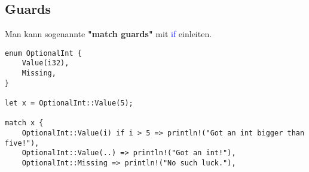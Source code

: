 \subsection{Guards}
Man kann sogenannte \textbf{"match guards"} mit \textcolor{blue}{if} einleiten.

\begin{lstlisting}
enum OptionalInt {
	Value(i32),
	Missing,
}

let x = OptionalInt::Value(5);

match x {
    OptionalInt::Value(i) if i > 5 => println!("Got an int bigger than five!"),
    OptionalInt::Value(..) => println!("Got an int!"),
    OptionalInt::Missing => println!("No such luck."),
\end{lstlisting}